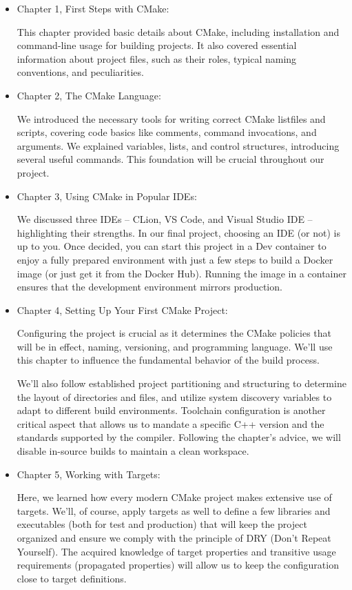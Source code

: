 \begin{itemize}
\item
Chapter 1, First Steps with CMake:

This chapter provided basic details about CMake, including installation and command-line usage for building projects. It also covered essential information about project files, such as their roles, typical naming conventions, and peculiarities.

\item
Chapter 2, The CMake Language:

We introduced the necessary tools for writing correct CMake listfiles and scripts, covering code basics like comments, command invocations, and arguments. We explained variables, lists, and control structures, introducing several useful commands. This foundation will be crucial throughout our project.

\item
Chapter 3, Using CMake in Popular IDEs:

We discussed three IDEs – CLion, VS Code, and Visual Studio IDE – highlighting their strengths. In our final project, choosing an IDE (or not) is up to you. Once decided, you can start this project in a Dev container to enjoy a fully prepared environment with just a few steps to build a Docker image (or just get it from the Docker Hub). Running the image in a container ensures that the development environment mirrors production.

\item
Chapter 4, Setting Up Your First CMake Project:

Configuring the project is crucial as it determines the CMake policies that will be in effect, naming, versioning, and programming language. We’ll use this chapter to influence the fundamental behavior of the build process.

We’ll also follow established project partitioning and structuring to determine the layout of directories and files, and utilize system discovery variables to adapt to different build environments. Toolchain configuration is another critical aspect that allows us to mandate a specific C++ version and the standards supported by the compiler. Following the chapter’s advice, we will disable in-source builds to maintain a clean workspace.

\item
Chapter 5, Working with Targets:

Here, we learned how every modern CMake project makes extensive use of targets. We’ll, of course, apply targets as well to define a few libraries and executables (both for test and production) that will keep the project organized and ensure we comply with the principle of DRY (Don’t Repeat Yourself). The acquired knowledge of target properties and transitive usage requirements (propagated properties) will allow us to keep the configuration close to target definitions.


\end{itemize}
